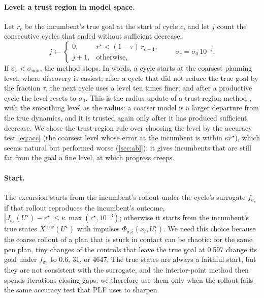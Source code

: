 \documentclass[11pt]{article}
\theoremstyle{remark}
\newcommand{\epsref}{\bar{\epsilon}}
\newcommand{\smin}{\sigma_{\min}}
\newcommand{\inc}{U^\star}
\newcommand{\rinc}{r^\star}
\begin{document}
\paragraph{Level: a trust region in model space.} Let $r_c$ be the incumbent's true goal at the start of cycle $c$, and let $j$ count the consecutive cycles that ended without sufficient decrease,
\begin{equation}
\label{eq:j}
j \gets \begin{cases} 0, & \rinc < (1 - \tau)\, r_{c-1}, \\ j + 1, & \text{otherwise}, \end{cases} \qquad \sigma_c = \sigma_0\, 10^{-j}.
\end{equation}
If $\sigma_c < \smin$, the method stops. In words, a cycle starts at the coarsest planning level, where discovery is easiest; after a cycle that did not reduce the true goal by the fraction $\tau$, the next cycle uses a level ten times finer; and after a productive cycle the level resets to $\sigma_0$. This is the radius update of a trust-region method \cite{conn2000trust}, with the smoothing level as the radius: a coarser model is a larger departure from the true dynamics, and it is trusted again only after it has produced sufficient decrease. We chose the trust-region rule over choosing the level by the accuracy test \cref{eq:acc} (the coarsest level whose error at the incumbent is within $\kappa\rinc$), which seems natural but performed worse (\cref{sec:abl}): it gives incumbents that are still far from the goal a fine level, at which progress creeps.

\paragraph{Start.} The excursion starts from the incumbent's rollout under the cycle's surrogate $f_{\sigma_c}$ if that rollout reproduces the incumbent's outcome, $|J_{\sigma_c}(\inc) - \rinc| \leq \kappa\,\max(\rinc, 10^{-3})$; otherwise it starts from the incumbent's true states $X^{\mathrm{true}}(\inc)$ with impulses $\Phi_{\sigma_c\epsref}(x_t, \inc_t)$. We need this choice because the coarse rollout of a plan that is stuck in contact can be chaotic: for the same pen plan, tiny changes of the controls that leave the true goal at 0.597 change its goal under $f_{\sigma_0}$ to 0.6, 31, or 4647. The true states are always a faithful start, but they are not consistent with the surrogate, and the interior-point method then spends iterations closing gaps; we therefore use them only when the rollout fails the same accuracy test that PLF uses to sharpen.
\end{document}
